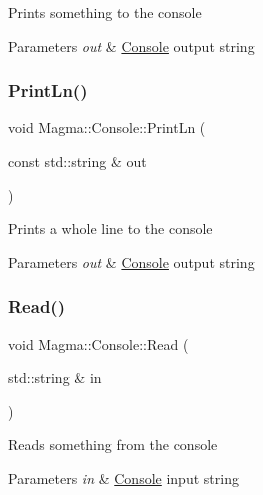 Prints something to the console 


\begin{DoxyParams}{Parameters}
{\em out} & \hyperlink{class_magma_1_1_console}{Console} output string\\
\hline
\end{DoxyParams}
\mbox{\label{class_magma_1_1_console_aa8ab1a56c768f05eab042bf76c3447e2}} 
\subsubsection{\texorpdfstring{Print\+Ln()}{PrintLn()}}
{\footnotesize\ttfamily void Magma\+::\+Console\+::\+Print\+Ln (\begin{DoxyParamCaption}\item[{const std\+::string \&}]{out }\end{DoxyParamCaption})\hspace{0.3cm}{\ttfamily [static]}}



Prints a whole line to the console 


\begin{DoxyParams}{Parameters}
{\em out} & \hyperlink{class_magma_1_1_console}{Console} output string\\
\hline
\end{DoxyParams}
\mbox{\label{class_magma_1_1_console_afc79ad097b46bfcf38e9bcff89f3354d}} 
\subsubsection{\texorpdfstring{Read()}{Read()}}
{\footnotesize\ttfamily void Magma\+::\+Console\+::\+Read (\begin{DoxyParamCaption}\item[{std\+::string \&}]{in }\end{DoxyParamCaption})\hspace{0.3cm}{\ttfamily [static]}}



Reads something from the console 


\begin{DoxyParams}{Parameters}
{\em in} & \hyperlink{class_magma_1_1_console}{Console} input string\\
\hline
\end{DoxyParams}
\mbox{\label{class_magma_1_1_console_a984a8294955770ff171817e5e228a629}} 
